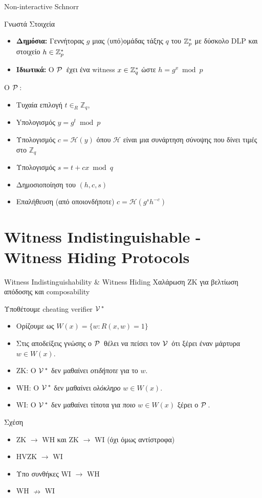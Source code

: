\documentclass[10pt,handout]{beamer}
\begin{document}
\begin{frame}{Non-interactive Schnorr}
\begin{block}{Γνωστά Στοιχεία}
\begin{itemize}
\item \textbf{Δημόσια:} Γεννήτορας $g$ μιας (υπό)ομάδας τάξης $q$ του $\mathbb{Z}^*_{p}$ με δύσκολο DLP και στοιχείο $h \in \mathbb{Z}^*_{p}$ 
\item \textbf{Ιδιωτικά:} O $\mathcal{P}\,$ έχει ένα witness $x \in \mathbb{Z}^*_{q}$ ώστε $h = g^x \bmod{p}$
\end{itemize}
\end{block}
\pause
O  $\mathcal{P}\,$:
\begin{itemize}
\item Τυχαία επιλογή $t \in_R \mathbb{Z}_{q}$,
\pause
\item Yπολογισμός $y = g^t \bmod{p}$
\pause
\item Υπολογισμός $c = \mathcal{H}(y)$ όπου $\mathcal{H}$ είναι μια συνάρτηση σύνοψης που δίνει τιμές στο $\mathbb{Z}_{q}$
\pause

\item Υπολογισμός $s=t+cx \bmod{q}$
\pause
\item Δημοσιοποίηση του $(h,c,s)$
\pause
\item Επαλήθευση (από οποιονδήποτε) $c = \mathcal{H} (g^s h^{-c})$
\end{itemize}
\end{frame} 

\section{Witness Indistinguishable - Witness Hiding Protocols}

\begin{frame}{Witness Indistinguishability \& Witness Hiding}
	Χαλάρωση ΖΚ για βελτίωση απόδοσης και composability 

	Υποθέτουμε cheating verifier $\mathcal{V}\,^*$
	\begin{itemize}
	  \item Ορίζουμε ως $W(x)=\{w : R(x,w)=1 \}$ \pause
	  \item Στις αποδείξεις γνώσης ο $\mathcal{P}\,$ θέλει να πείσει τον $\mathcal{V}\,$ ότι ξέρει έναν μάρτυρα $w\in W(x)$. \pause
	  \item ZK: O $\mathcal{V}\,^*$ δεν μαθαίνει \emph{οτιδήποτε} για το $w$. \pause
	  \item WH: Ο $\mathcal{V}\,^*$ δεν μαθαίνει \emph{ολόκληρο} $w \in W(x)$. \pause
	  \item WI: Ο $\mathcal{V}\,^*$ δεν μαθαίνει τίποτα για \emph{ποιο} $w \in W(x)$ ξέρει ο $\mathcal{P}\,$. \pause
	\end{itemize}

	Σχέση \pause
	\begin{itemize}
		\item ZK $\rightarrow$ WH και ZK $\rightarrow$ WΙ (όχι όμως αντίστροφα)
		\item HVZK $\rightarrow$ WI
		\item Υπο συνθήκες WI $\rightarrow$ WH 
		\item WΗ $\nrightarrow$ WI 
	\end{itemize}
\end{frame}
  
\end{document}
